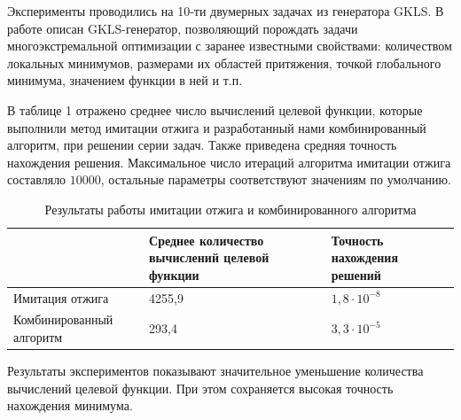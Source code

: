 \documentclass[11pt, oneside, a4paper]{article}
\begin{document}
\newpage



Эксперименты проводились на 10-ти двумерных задачах из генератора GKLS. В работе \cite{fio_bib19} \cite{fio_bib20} описан GKLS-генератор, позволяющий порождать задачи многоэкстремальной оптимизации с заранее известными свойствами: количеством локальных минимумов, размерами их областей притяжения, точкой глобального минимума, значением функции в ней и т.п. 

В таблице 1 отражено среднее число вычислений целевой функции, которые выполнили метод имитации отжига и разработанный нами комбинированный алгоритм, при решении серии задач. Также приведена средняя точность нахождения решения. Максимальное число итераций алгоритма имитации отжига составляло $10000$, остальные параметры соответствуют значениям по умолчанию. 

\begin{table}
	\caption{Результаты работы имитации отжига и комбинированного алгоритма}
	\begin{center}
		\begin{tabular}{|m{3.8cm}|m{6cm} |m{6cm}|}
			\hline
			 & Среднее количество вычислений целевой функции & Точность нахождения решений\\
			 \hline
			 Имитация отжига & 4255,9 & $1,8 \cdot 10^{-8}$\\
			 \hline 
			 Комбинированный алгоритм & 293,4 & $3,3 \cdot 10^{-5}$\\
			 \hline
		\end{tabular}
	\end{center}
\end{table}

Результаты экспериментов показывают значительное уменьшение количества вычислений целевой функции. При этом сохраняется высокая точность нахождения минимума.
\end{document}
